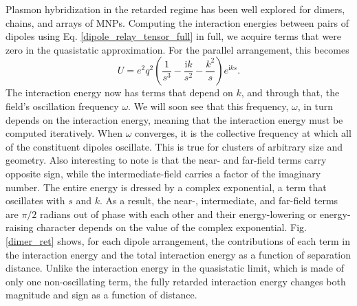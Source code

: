 \documentclass [11pt, proquest] {uwthesis}[2016/11/22]
\begin{document}
Plasmon hybridization in the retarded regime has been well explored for dimers, chains, and arrays of MNPs. Computing the interaction energies between pairs of dipoles using Eq. \ref{dipole_relay_tensor_full} in full, we acquire terms that were zero in the quasistatic approximation. For the parallel arrangement, this becomes
\begin{equation}
U = e^2q^2\left(\frac{1}{s^3}-\frac{\textrm{i}k}{s^2}-\frac{k^2}{s}\right)e^{\textrm{i}ks}.
\label{int_ret}
\end{equation}
The interaction energy now has terms that depend on $k$, and through that, the field's oscillation frequency $\omega$. We will soon see that this frequency, $\omega$, in turn depends on the interaction energy, meaning that the interaction energy must be computed iteratively. When $\omega$ converges, it is the collective frequency at which all of the constituent dipoles oscillate. This is true for clusters of arbitrary size and geometry. Also interesting to note is that the near- and far-field terms carry opposite sign, while the intermediate-field carries a factor of the imaginary number. The entire energy is dressed by a complex exponential, a term that oscillates with $s$ and $k$. As a result, the near-, intermediate, and far-field terms are $\pi/2$ radians out of phase with each other and their energy-lowering or energy-raising character depends on the value of the complex exponential. Fig. \ref{dimer_ret} shows, for each dipole arrangement, the contributions of each term in the interaction energy and the total interaction energy as a function of separation distance. Unlike the interaction energy in the quasistatic limit, which is made of only one non-oscillating term, the fully retarded interaction energy changes both magnitude and sign as a function of distance.
\end{document}
